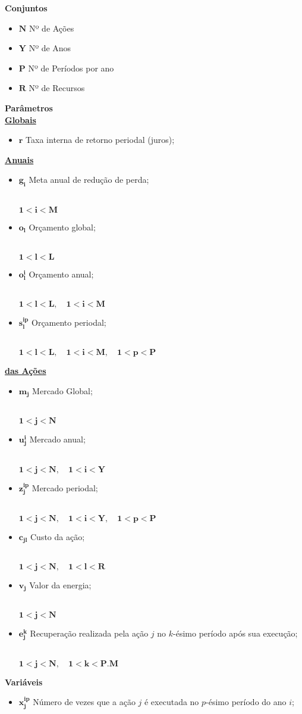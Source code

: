 \documentclass{article}
\newcommand{\topico}[1]{
  \vspace{10pt}
  {\Large \bf #1 }
  \\
}
\newcommand{\subtopico}[1]{
  \vspace{6pt}
  {\large \bf \underline{#1}}
  \\
}
\newcommand{\variavel}[1]{
  { \Large $ \mathbf{ #1 } $}
}
\newcommand{\decorator}[1]{
  {\\ \small \hspace*{10pt} $ \mathbf{ #1 } $ }
}
\begin{document}
\topico{Conjuntos}

\begin{itemize}
  \item \variavel{N} Nº de Ações
  \item \variavel{Y} Nº de Anos
  \item \variavel{P} Nº de Períodos por ano
  \item \variavel{R} Nº de Recursos
\end{itemize}

\topico{Parâmetros}

\subtopico{Globais}
\begin{itemize}
  \item \variavel{r} Taxa interna de retorno periodal (juros);
\end{itemize}

\subtopico{Anuais}
\begin{itemize}
  \item \variavel{g_i} Meta anual de redução de perda;
    \decorator{1 < i < M}
  \item \variavel{o_l} Orçamento global;
    \decorator{1 < l < L}
  \item \variavel{o_l^i} Orçamento anual;
    \decorator{1 < l < L, \quad 1 < i < M}
  \item \variavel{s_l^{ip}} Orçamento periodal;
    \decorator{1 < l < L, \quad 1 < i < M, \quad 1 < p < P}
\end{itemize}

\subtopico{das Ações}
\begin{itemize}
  \item \variavel{m_j} Mercado Global;
    \decorator{1 < j < N}
  \item \variavel{u_j^i} Mercado anual;
    \decorator{1 < j < N, \quad 1 < i < Y}
  \item \variavel{z_j^{ip}} Mercado periodal;
    \decorator{1 < j < N, \quad 1 < i < Y, \quad 1 < p < P}
  \item \variavel{c_{jl}} Custo da ação;
    \decorator{1 < j < N, \quad 1 < l < R}
  \item \variavel{v_j} Valor da energia;
    \decorator{1 < j < N}
  \item \variavel{e_j^k} Recuperação realizada pela ação $j$ no $k$-ésimo período
    após sua execução;
    \decorator{1 < j < N, \quad 1 < k < P.M}
\end{itemize}

\topico{Variáveis}

\begin{itemize}
  \item \variavel{x_j^{ip}} Número de vezes que a ação $j$ é executada no $p$-ésimo período do ano $i$;
\end{itemize}
\end{document}
